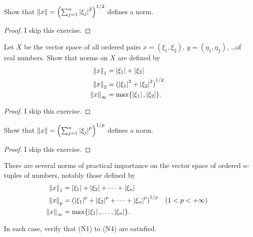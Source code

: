 \begin{exercise}\label{chapter2:section2:exercise5}
    Show that $\left\Vert{x}\right\Vert = {\left(\sum^{n}_{j=1}\left\vert{\xi_{j}}\right\vert^{2}\right)}^{1/2}$ defines a norm.
\end{exercise}

\begin{proof}
    I skip this exercise.
\end{proof}

\begin{exercise}\label{chapter2:section2:exercise6}
    Let $X$ be the vector space of all ordered pairs $x = (\xi_{1}, \xi_{2})$, $y = (\eta_{1}, \eta_{2})$, \ldots of real numbers. Show that norms on $X$ are defined by
    \begin{align*}
        \left\Vert{x}\right\Vert_{1}      & = \left\vert{\xi_{1}}\right\vert + \left\vert{\xi_{2}}\right\vert                   \\
        \left\Vert{x}\right\Vert_{2}      & = {(\left\vert{\xi_{1}}\right\vert^{2} + \left\vert{\xi_{2}}\right\vert^{2})}^{1/2} \\
        \left\Vert{x}\right\Vert_{\infty} & = \max\{ \left\vert{\xi_{1}}\right\vert, \left\vert{\xi_{2}}\right\vert \}.
    \end{align*}
\end{exercise}

\begin{proof}
    I skip this exercise.
\end{proof}

\begin{exercise}\label{chapter2:section2:exercise7}
    Show that $\left\Vert{x}\right\Vert = {\left(\sum^{n}_{j=1}\left\vert{\xi_{j}}\right\vert^{p}\right)}^{1/p}$ defines a norm.
\end{exercise}

\begin{proof}
    I skip this exercise.
\end{proof}

\begin{exercise}\label{chapter2:section2:exercise8}
    There are several norms of practical importance on the vector space of ordered $n$-tuples of numbers, notably those defined by
    \begin{align*}
        \left\Vert{x}\right\Vert_{1}      & = \left\vert{\xi_{1}}\right\vert + \left\vert{\xi_{2}}\right\vert + \cdots + \left\vert{\xi_{n}}\right\vert                                                      \\
        \left\Vert{x}\right\Vert_{p}      & = {\left(\left\vert{\xi_{1}}\right\vert^{p} + \left\vert{\xi_{2}}\right\vert^{p} + \cdots + \left\vert{\xi_{n}}\right\vert^{p}\right)}^{1/p} & (1 < p < +\infty) \\
        \left\Vert{x}\right\Vert_{\infty} & = \max\{ \left\vert{\xi_{1}}\right\vert, \ldots, \left\vert{\xi_{n}}\right\vert \}.
    \end{align*}

    In each case, verify that (N1) to (N4) are satisfied.
\end{exercise}

